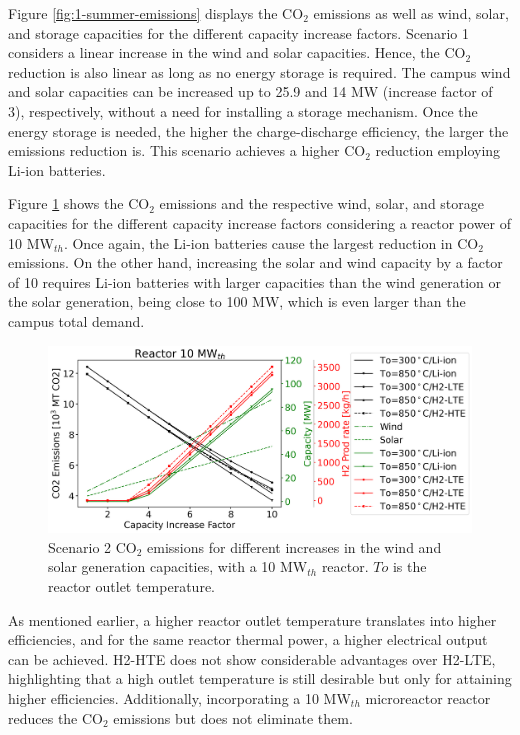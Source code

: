 \documentclass{anstrans}
\begin{document}
Figure \ref{fig:1-summer-emissions} displays the CO$_2$ emissions as well as wind, solar, and storage capacities for the different capacity increase factors.
Scenario 1 considers a linear increase in the wind and solar capacities.
Hence, the CO$_2$ reduction is also linear as long as no energy storage is required.
The campus wind and solar capacities can be increased up to 25.9 and 14 MW (increase factor of 3), respectively, without a need for installing a storage mechanism.
Once the energy storage is needed, the higher the charge-discharge efficiency, the larger the emissions reduction is.
This scenario achieves a higher CO$_2$ reduction employing Li-ion batteries.

Figure \ref{fig:2-summer-10-emissions} shows the CO$_2$ emissions and the respective wind, solar, and storage capacities for the different capacity increase factors considering a reactor power of 10 MW$_{th}$.
Once again, the Li-ion batteries cause the largest reduction in CO$_2$ emissions.
On the other hand, increasing the solar and wind capacity by a factor of 10 requires Li-ion batteries with larger capacities than the wind generation or the solar generation, being close to 100 MW, which is even larger than the campus total demand.

\begin{figure}[htbp!] %
    \centering
    \includegraphics[width=0.99\linewidth]{figures/scenario2-10-summer-emissions}
    \hfill
    \caption{Scenario 2 CO$_2$ emissions for different increases in the wind and solar generation capacities, with a 10 MW$_{th}$ reactor. $To$ is the reactor outlet temperature.}
    \label{fig:2-summer-10-emissions}
\end{figure}

As mentioned earlier, a higher reactor outlet temperature translates into higher efficiencies, and for the same reactor thermal power, a higher electrical output can be achieved.
H2-HTE does not show considerable advantages over H2-LTE, highlighting that a high outlet temperature is still desirable but only for attaining higher efficiencies.
Additionally, incorporating a 10 MW$_{th}$ microreactor reactor reduces the CO$_2$ emissions but does not eliminate them.
\end{document}
